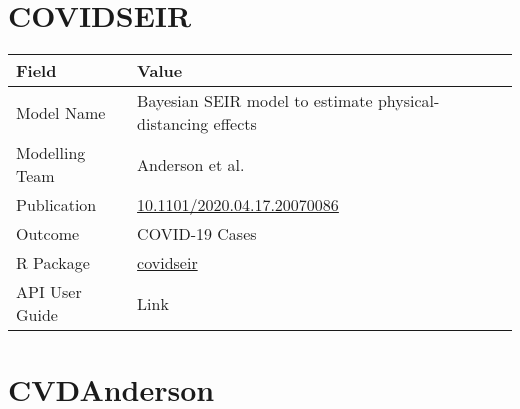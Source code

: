 \documentclass[
]{book}
\begin{document}
\hypertarget{covidseir}{%
\chapter{COVIDSEIR}\label{covidseir}}

\begin{longtable}[]{@{}ll@{}}
\toprule
Field & Value\tabularnewline
\midrule
\endhead
Model Name & Bayesian SEIR model to estimate physical-distancing effects\tabularnewline
Modelling Team & Anderson et al.\tabularnewline
Publication & \href{https://doi.org/10.1101/2020.04.17.20070086}{10.1101/2020.04.17.20070086}\tabularnewline
Outcome & COVID-19 Cases\tabularnewline
R Package & \href{https://github.com/seananderson/covidseir}{covidseir}\tabularnewline
API User Guide & Link\tabularnewline
\bottomrule
\end{longtable}

\hypertarget{cvdanderson}{%
\chapter{CVDAnderson}\label{cvdanderson}}
\end{document}
